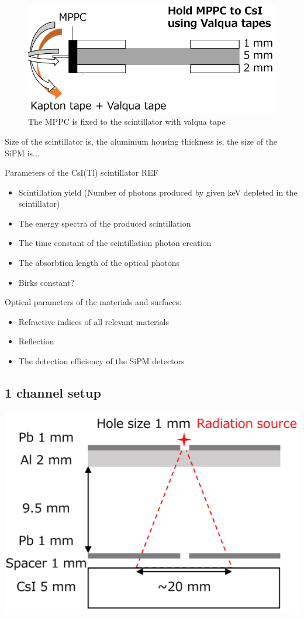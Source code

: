 \documentclass[12pt, a4paper,titlepage]{article}
\numberwithin{equation}{section}
\numberwithin{figure}{section}
\begin{document}
\begin{figure}
\includegraphics[width=130.0mm]{images/tap1channel.png}
\caption{\label{fig:1channeltape} The MPPC is fixed to the scintillator with valqua tape}
\end{figure}



Size of the scintillator is, the aluminium housing thickness is, the size of the SiPM is...

Parameters of the CsI(Tl) scintillator REF

\begin{itemize}
\item Scintillation yield (Number of photons produced by given keV depleted in the scintillator)
\item The energy spectra of the produced scintillation
\item The time constant of the scintillation photon creation
\item The absorbtion length of the optical photons
\item Birks constant?
\end{itemize}

Optical parameters of the materials and surfaces:
\begin{itemize}
\item Refractive indices of all relevant materials
\item Reflection
\item The detection efficiency of the SiPM detectors
\end{itemize}

\subsection{1 channel setup}

\includegraphics[width=150.0mm]{images/irradiation.png}
\end{document}
